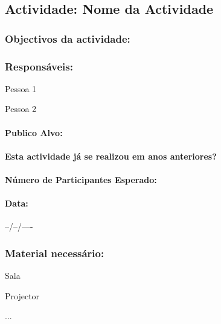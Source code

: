 \subsection{Actividade: Nome da Actividade} %

\subsubsection*{Objectivos da actividade:}

\subsubsection*{Responsáveis:}
\begin{itemizedash}
	\item{Pessoa 1}
	\item{Pessoa 2}
\end{itemizedash}

\paragraph{Publico Alvo: }

\paragraph{Esta actividade já se realizou em anos anteriores?}

\paragraph{Número de Participantes Esperado:}

\paragraph{Data:} --/--/----

\subsubsection*{Material necessário:}
\begin{itemizedash}
	\item{Sala}
	\item{Projector}
	\item{...}
\end{itemizedash}

